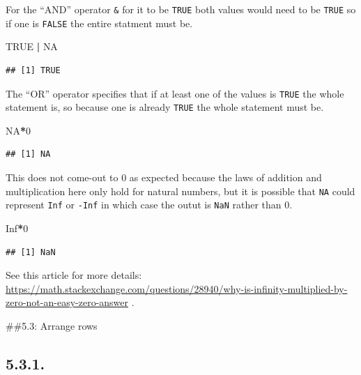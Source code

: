 \documentclass[]{book}
\newenvironment{Shaded}{\begin{snugshade}}{\end{snugshade}}
\newcommand{\DecValTok}[1]{\textcolor[rgb]{0.00,0.00,0.81}{#1}}
\newcommand{\OperatorTok}[1]{\textcolor[rgb]{0.81,0.36,0.00}{\textbf{#1}}}
\newcommand{\OtherTok}[1]{\textcolor[rgb]{0.56,0.35,0.01}{#1}}
\newcommand{\StringTok}[1]{\textcolor[rgb]{0.31,0.60,0.02}{#1}}
\theoremstyle{definition}
\theoremstyle{definition}
\theoremstyle{definition}
\theoremstyle{remark}
\begin{document}
For the ``AND'' operator \texttt{\&} for it to be \texttt{TRUE} both
values would need to be \texttt{TRUE} so if one is \texttt{FALSE} the
entire statment must be.

\begin{Shaded}
\begin{Highlighting}[]
\OtherTok{TRUE} \OperatorTok{|}\StringTok{ }\OtherTok{NA}
\end{Highlighting}
\end{Shaded}

\begin{verbatim}
## [1] TRUE
\end{verbatim}

The ``OR'' operator \texttt{\textbar{}} specifies that if at least one
of the values is \texttt{TRUE} the whole statement is, so because one is
already \texttt{TRUE} the whole statement must be.

\begin{Shaded}
\begin{Highlighting}[]
\OtherTok{NA}\OperatorTok{*}\DecValTok{0}
\end{Highlighting}
\end{Shaded}

\begin{verbatim}
## [1] NA
\end{verbatim}

This does not come-out to 0 as expected because the laws of addition and
multiplication here only hold for natural numbers, but it is possible
that \texttt{NA} could represent \texttt{Inf} or \texttt{-Inf} in which
case the outut is \texttt{NaN} rather than 0.

\begin{Shaded}
\begin{Highlighting}[]
\OtherTok{Inf}\OperatorTok{*}\DecValTok{0}
\end{Highlighting}
\end{Shaded}

\begin{verbatim}
## [1] NaN
\end{verbatim}

See this article for more details:
\url{https://math.stackexchange.com/questions/28940/why-is-infinity-multiplied-by-zero-not-an-easy-zero-answer}
.

\#\#5.3: Arrange rows

\hypertarget{section-8}{%
\subsection{5.3.1.}\label{section-8}}
\end{document}
